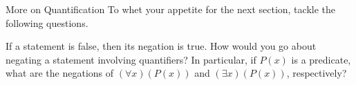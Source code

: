 \begin{section}{More on Quantification}
To whet your appetite for the next section, tackle the following questions.

\begin{question}
If a statement is false, then its negation is true.  How would you go about negating a statement involving quantifiers?  In particular, if $P(x)$ is a predicate, what are the negations of $(\forall x)(P(x))$ and $(\exists x)(P(x))$, respectively?
\end{question}

\end{section}


